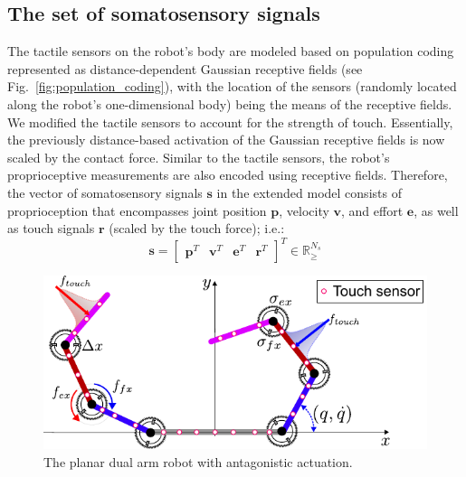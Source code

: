 \subsection{The set of somatosensory signals}
The tactile sensors on the robot's body are modeled based on population coding \cite{Panzeri2010PopulationCoding} represented as distance-dependent Gaussian receptive fields (see Fig.~\ref{fig:population_coding}), with the location of the sensors (randomly located along the robot's one-dimensional body) being the means of the receptive fields. We modified the tactile sensors to account for the strength of touch. Essentially, the previously distance-based activation of the Gaussian receptive fields is now scaled by the contact force. Similar to the tactile sensors, the robot's proprioceptive measurements are also encoded using receptive fields. Therefore, the vector of somatosensory signals $\bm{s}$ in the extended model consists of proprioception that encompasses joint position $\bm{p}$, velocity $\bm{v}$, and effort $\bm{e}$, as well as touch signals $\bm{r}$ (scaled by the touch force); i.e.:
\begin{equation}
	\bm{s} = \begin{bmatrix}
		\bm{p}^T & \bm{v}^T & \bm{e}^T & \bm{r}^T
	\end{bmatrix}^T \in \mathbb{R}^{N_s}_{\geq}
\end{equation}
\begin{figure}[!t]
	\begin{center}
		\hspace*{\fill}
		\includegraphics[width=0.99\columnwidth]{extended_dual_arm_robot.pdf}
		\hspace*{\fill}
	\end{center}
	\caption{\label{fig:extended_dual_arm_robot} The planar dual arm robot with antagonistic actuation.}
\end{figure}



